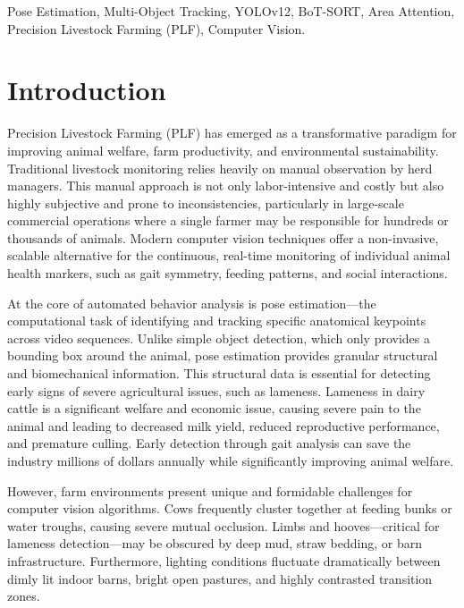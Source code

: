 \documentclass[conference]{IEEEtran}
\begin{document}
\begin{IEEEkeywords}
Pose Estimation, Multi-Object Tracking, YOLOv12, BoT-SORT, Area Attention, Precision Livestock Farming (PLF), Computer Vision.
\end{IEEEkeywords}

\section{Introduction}
Precision Livestock Farming (PLF) has emerged as a transformative paradigm for improving animal welfare, farm productivity, and environmental sustainability. Traditional livestock monitoring relies heavily on manual observation by herd managers. This manual approach is not only labor-intensive and costly but also highly subjective and prone to inconsistencies, particularly in large-scale commercial operations where a single farmer may be responsible for hundreds or thousands of animals. Modern computer vision techniques offer a non-invasive, scalable alternative for the continuous, real-time monitoring of individual animal health markers, such as gait symmetry, feeding patterns, and social interactions.

At the core of automated behavior analysis is pose estimation—the computational task of identifying and tracking specific anatomical keypoints across video sequences. Unlike simple object detection, which only provides a bounding box around the animal, pose estimation provides granular structural and biomechanical information. This structural data is essential for detecting early signs of severe agricultural issues, such as lameness. Lameness in dairy cattle is a significant welfare and economic issue, causing severe pain to the animal and leading to decreased milk yield, reduced reproductive performance, and premature culling. Early detection through gait analysis can save the industry millions of dollars annually while significantly improving animal welfare.

However, farm environments present unique and formidable challenges for computer vision algorithms. Cows frequently cluster together at feeding bunks or water troughs, causing severe mutual occlusion. Limbs and hooves—critical for lameness detection—may be obscured by deep mud, straw bedding, or barn infrastructure. Furthermore, lighting conditions fluctuate dramatically between dimly lit indoor barns, bright open pastures, and highly contrasted transition zones. 
\end{document}
